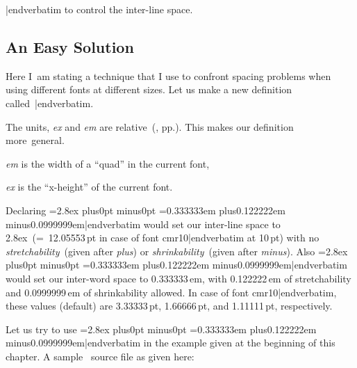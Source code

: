 {{{\color{brown}\verbatim \baselineskip|endverbatim} to control the inter-line space.




\subsection{An Easy Solution}Here I~am stating a technique that I use to confront spacing problems when using different fonts at different sizes. Let us make a new definition called~{\color{brown}\verbatim \fontspacing|endverbatim}.\ms

\sk
             \def\fontspacing{\baselineskip=2.8ex plus0pt minus0pt
             \spaceskip=0.333333em plus0.122222em minus0.0999999em}

\ii The units, {\sl ex\/} and {\sl em\/} are relative~(\cite{knuth_texbook}, pp.). This makes our definition more~general.\ms

{\sl em\/} is the width of a ``quad'' in the current font,

{\sl ex\/} is the ``x-height'' of the current font.\sk

\ii Declaring {\color{brown}\verbatim \fontspacing|endverbatim} would set our inter-line space to 2.8ex~(=~12.05553\,pt in case of font {\verbatim cmr10|endverbatim} at 10\,pt) with no {\sl stretchability\/}~(given after {\sl plus\/}) or {\sl shrinkability}~(given after {\sl minus\/}). Also {\color{brown}\verbatim \fontspacing|endverbatim} would set our inter-word space to 0.333333\,em, with 0.122222\,em of stretchability and 0.0999999\,em of shrinkability allowed. In case of font {\verbatim cmr10|endverbatim}, these values (default) are 3.33333\,pt, 1.66666\,pt, and 1.11111\,pt, respectively.

Let us try to use {\color{brown}\verbatim \fontspacing|endverbatim} in the example given at the beginning of this chapter. A sample \capstex\ source file as given here:


\newpage

}}
